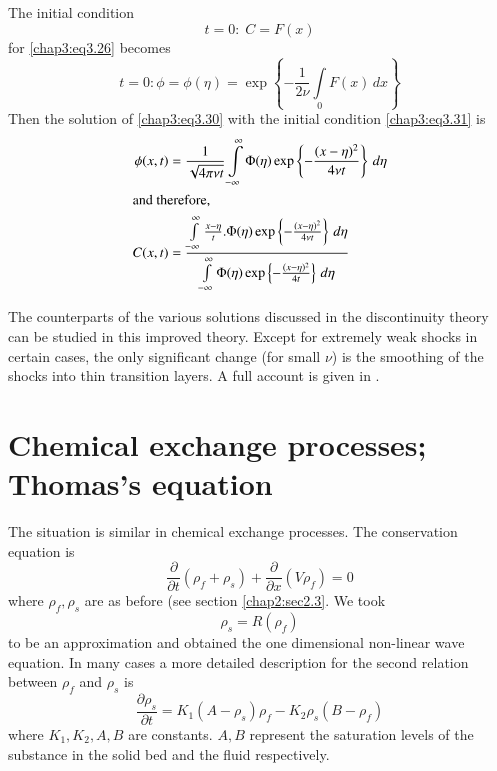 The initial condition
$$
t=0:\; C=F(x)
$$
for \eqref{chap3:eq3.26} becomes
\begin{equation}
t=0:\phi =\phi(\eta)=\exp\left\{-\frac{1}{2\nu}\int\limits_0F(x)\,dx \right\}\tag{3.31}\label{chap3:eq3.31}
\end{equation}\pageoriginale
Then the solution of \eqref{chap3:eq3.30} with the initial condition \eqref{chap3:eq3.31} is 
\begin{align*}
\phi(x,t) &= \frac{1}{\sqrt{4\pi\nu t}}\int\limits_{-\infty}^{\infty}\Phi (\eta)\exp\left\{-\frac{(x-\eta)^2}{4\nu t}\right\}\,d\eta\\
\intertext{and therefore,}
C(x,t) &= \frac{\int\limits_{-\infty}^\infty \frac{x-\eta}{t}.\Phi(\eta)\exp \left\{-\frac{(x-\eta)^2}{4\nu t}\right\}\,d\eta} {\int\limits_{-\infty}^\infty \Phi(\eta)\exp\left\{-\frac{(x-\eta)^2}{4 t}\right\}\,d\eta}
\end{align*}

The counterparts of the various solutions discussed in the discontinuity theory can be studied in this improved theory. Except for extremely weak shocks in certain cases, the only significant change (for small $\nu$) is the smoothing of the shocks into thin transition layers. A full account is given in \cite{key1}.

\section{Chemical exchange processes; Thomas's equation}\label{chap3:sec3.6}

The situation is similar in chemical exchange processes. The conservation equation is 
\begin{equation}
\frac{\partial}{\partial t}\left(\rho_f+\rho_s\right)+\frac{\partial}{\partial x} \left(V\rho_f\right)=0\tag{3.32}\label{chap3:eq3.32}
\end{equation}
where $\rho_f,\rho_s$ are as before (see section \ref{chap2:sec2.3}. We took 
\begin{equation}
\rho_s=R\left(\rho_f\right)\tag{3.33}\label{chap3:eq3.33}
\end{equation}
to be an approximation and obtained the one dimensional non-linear wave equation. In many cases a more detailed description for the second relation between $\rho_f$ and $\rho_s$ is 
\begin{equation}
\frac{\partial\rho_s}{\partial t}=K_1\left(A-\rho_s\right)\rho_f-K_2\rho_s\left(B-\rho_f\right) \tag{3.34}\label{chap3:eq3.34}
\end{equation}\pageoriginale
where $K_1, K_2, A,B$ are constants. $A,B$ represent the saturation levels of the substance in the solid bed and the fluid respectively. 

